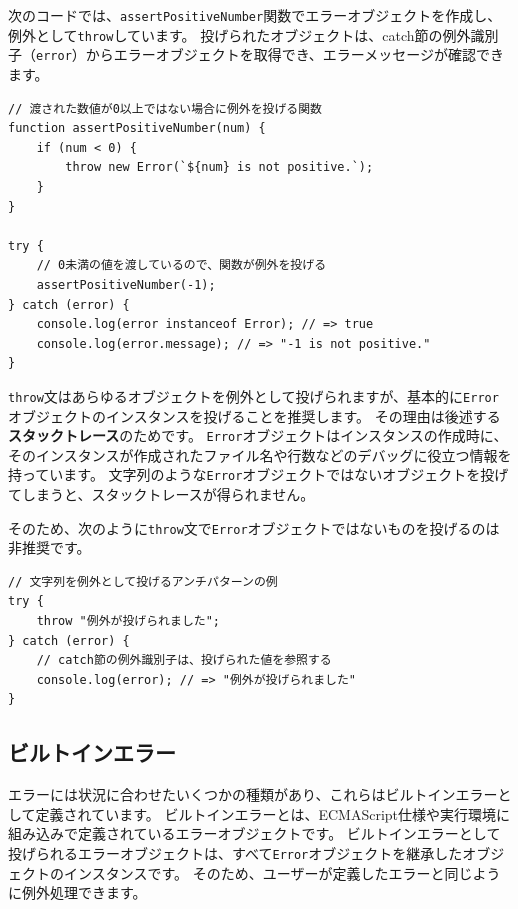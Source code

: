 次のコードでは、\texttt{assertPositiveNumber}関数でエラーオブジェクトを作成し、例外として\texttt{throw}しています。
投げられたオブジェクトは、catch節の例外識別子（\texttt{error}）からエラーオブジェクトを取得でき、エラーメッセージが確認できます。

\begin{lstlisting}
// 渡された数値が0以上ではない場合に例外を投げる関数
function assertPositiveNumber(num) {
    if (num < 0) {
        throw new Error(`${num} is not positive.`);
    }
}

try {
    // 0未満の値を渡しているので、関数が例外を投げる
    assertPositiveNumber(-1);
} catch (error) {
    console.log(error instanceof Error); // => true
    console.log(error.message); // => "-1 is not positive."
}
\end{lstlisting}

\texttt{throw}文はあらゆるオブジェクトを例外として投げられますが、基本的に\texttt{Error}オブジェクトのインスタンスを投げることを推奨します。
その理由は後述する\textbf{スタックトレース}のためです。
\texttt{Error}オブジェクトはインスタンスの作成時に、そのインスタンスが作成されたファイル名や行数などのデバッグに役立つ情報を持っています。
文字列のような\texttt{Error}オブジェクトではないオブジェクトを投げてしまうと、スタックトレースが得られません。

そのため、次のように\texttt{throw}文で\texttt{Error}オブジェクトではないものを投げるのは非推奨です。

\begin{lstlisting}
// 文字列を例外として投げるアンチパターンの例
try {
    throw "例外が投げられました";
} catch (error) {
    // catch節の例外識別子は、投げられた値を参照する
    console.log(error); // => "例外が投げられました"
}
\end{lstlisting}

\hypertarget{built-in-error}{%
\subsection{ビルトインエラー}\label{built-in-error}}

エラーには状況に合わせたいくつかの種類があり、これらはビルトインエラーとして定義されています。
ビルトインエラーとは、ECMAScript仕様や実行環境に組み込みで定義されているエラーオブジェクトです。
ビルトインエラーとして投げられるエラーオブジェクトは、すべて\texttt{Error}オブジェクトを継承したオブジェクトのインスタンスです。
そのため、ユーザーが定義したエラーと同じように例外処理できます。


